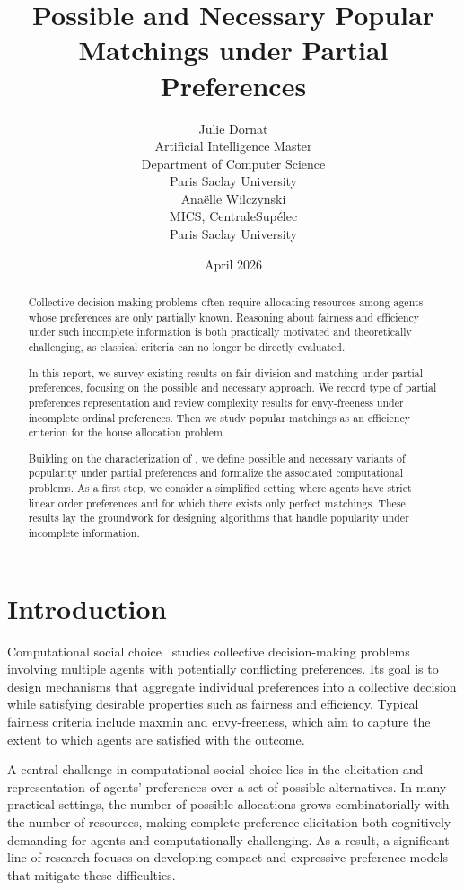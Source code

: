 \documentclass{article}
\title{Possible and Necessary Popular Matchings under Partial Preferences}
\author{Julie Dornat 
\\Artificial Intelligence Master \\
Department of Computer Science 
\\ Paris Saclay University \\
\And
Anaëlle Wilczynski
\\ MICS, CentraleSupélec 
\\ Paris Saclay University
}
\date{April 2026}
\begin{document}
\maketitle

\begin{abstract}
Collective decision-making problems often require allocating resources among agents whose preferences are only partially known. 
Reasoning about fairness and efficiency under such incomplete information is both practically motivated and theoretically challenging, as classical criteria can no longer be directly evaluated.

In this report, we survey existing results on fair division and matching under partial preferences, focusing on the possible and necessary approach. 
We record type of partial preferences representation and review complexity results for envy-freeness under incomplete ordinal preferences. 
Then we study popular matchings as an efficiency criterion for the house allocation problem.

Building on the characterization of \cite{abraham2007popular}, we define possible and necessary variants of popularity under partial preferences and formalize the associated computational problems. 
As a first step, we consider a simplified setting where agents have strict linear order preferences and for which there exists only perfect matchings.
These results lay the groundwork for designing algorithms that handle popularity under incomplete information.
\end{abstract}

\section{Introduction}

Computational social choice~\citep{brandt2016handbook} studies collective decision-making problems involving multiple agents with potentially conflicting preferences. 
Its goal is to design mechanisms that aggregate individual preferences into a collective decision while satisfying desirable properties such as fairness and efficiency. 
Typical fairness criteria include maxmin and envy-freeness, which aim to capture the extent to which agents are satisfied with the outcome.

A central challenge in computational social choice lies in the elicitation and representation of agents' preferences over a set of possible alternatives. 
In many practical settings, the number of possible allocations grows combinatorially with the number of resources, making complete preference elicitation both cognitively demanding for agents and computationally challenging. 
As a result, a significant line of research focuses on developing compact and expressive preference models that mitigate these difficulties.
\end{document}
